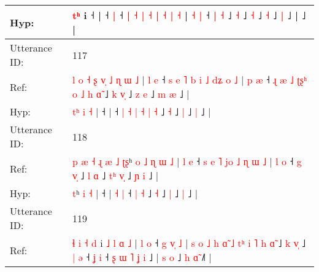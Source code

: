 \documentclass[10pt]{article}
\DeclareRobustCommand{\hl}[1]{{\textcolor{red}{#1}}}
\begin{document}
\begin{longtable}{ll}
 \\
Hyp: & \hl{}\hl{}\hl{}\hl{t}\hl{ʰ} i ˧\hl{}\hl{}\hl{}\hl{}\hl{}\hl{}\hl{}\hl{}\hl{}\hl{}\hl{}\hl{}\hl{}\hl{}\hl{}\hl{}\hl{}\hl{}\hl{} |\hl{}\hl{}\hl{}\hl{}\hl{}\hl{}\hl{}\hl{} ˧\hl{}\hl{} \hl{|} ˧\hl{}\hl{} \hl{|} \hl{˧} \hl{|} \hl{˧} \hl{|} \hl{˧} \hl{|} \hl{˧} | \hl{˧} \hl{|} ˧ \hl{|} \hl{}\hl{˧} ˩\hl{}\hl{} \hl{}\hl{˧} ˩\hl{}\hl{} \hl{}\hl{˧} ˩\hl{}\hl{} \hl{˧} ˩\hl{}\hl{} \hl{|} ˩ |\hl{}\hl{}\hl{}\hl{}\hl{}\hl{}\hl{}\hl{}\hl{}\hl{}\hl{}\hl{} ˩ |
 \\
\midrule
Utterance ID: & 117 \\
Ref: & \hl{l}\hl{ }\hl{o}\hl{ }\hl{˧}\hl{ }\hl{ʂ}\hl{ }\hl{v}\hl{̩}\hl{ }\hl{˩}\hl{ }\hl{ɳ} \hl{ɯ} \hl{˩} |\hl{ }\hl{l}\hl{ }\hl{e} ˧\hl{ }\hl{s}\hl{ }\hl{e}\hl{ }\hl{˥}\hl{ }\hl{b}\hl{ }\hl{i}\hl{ }\hl{˩}\hl{ }\hl{d}\hl{ʑ}\hl{ }\hl{o}\hl{ }\hl{˩} |\hl{ }\hl{p}\hl{ }\hl{æ} ˧\hl{ }\hl{ɻ}\hl{ }\hl{æ} \hl{˩} \hl{ʈ}\hl{ʂ}\hl{ʰ} \hl{o} \hl{˩} \hl{h} \hl{ɑ}\hl{̃} ˩\hl{ }\hl{k} \hl{v}\hl{̩} ˩\hl{ }\hl{z} \hl{e} ˩\hl{ }\hl{m} \hl{æ} ˩ |
 \\
Hyp: & \hl{}\hl{}\hl{}\hl{}\hl{}\hl{}\hl{}\hl{}\hl{}\hl{}\hl{}\hl{}\hl{t}\hl{ʰ} \hl{i} \hl{˧} |\hl{}\hl{}\hl{}\hl{} ˧\hl{}\hl{}\hl{}\hl{}\hl{}\hl{}\hl{}\hl{}\hl{}\hl{}\hl{}\hl{}\hl{}\hl{}\hl{}\hl{}\hl{}\hl{}\hl{} |\hl{}\hl{}\hl{}\hl{} ˧\hl{}\hl{}\hl{}\hl{} \hl{|} \hl{}\hl{}\hl{˧} \hl{|} \hl{˧} \hl{|} \hl{}\hl{˧} ˩\hl{}\hl{} \hl{}\hl{˧} ˩\hl{}\hl{} \hl{|} ˩\hl{}\hl{} \hl{|} ˩ |
 \\
\midrule
Utterance ID: & 118 \\
Ref: & \hl{p}\hl{ }\hl{æ}\hl{ }\hl{˧}\hl{ }\hl{ɻ}\hl{ }\hl{æ}\hl{ }\hl{˩}\hl{ }\hl{ʈ}\hl{ʂ}ʰ\hl{ }\hl{o}\hl{ }\hl{˩}\hl{ }\hl{ɳ} \hl{ɯ} \hl{˩} |\hl{ }\hl{l}\hl{ }\hl{e} ˧\hl{ }\hl{s}\hl{ }\hl{e}\hl{ }\hl{˥}\hl{ }\hl{j}\hl{o}\hl{ }\hl{˩}\hl{ }\hl{ɳ}\hl{ }\hl{ɯ}\hl{ }\hl{˩} | \hl{l} \hl{o} ˧ \hl{g} \hl{v}\hl{̩} ˩\hl{ }\hl{l} \hl{ɑ} ˩\hl{ }\hl{t}\hl{ʰ} \hl{v}\hl{̩} ˩\hl{ }\hl{ɲ} \hl{i} ˩ |
 \\
Hyp: & \hl{}\hl{}\hl{}\hl{}\hl{}\hl{}\hl{}\hl{}\hl{}\hl{}\hl{}\hl{}\hl{}\hl{t}ʰ\hl{}\hl{}\hl{}\hl{}\hl{}\hl{} \hl{i} \hl{˧} |\hl{}\hl{}\hl{}\hl{} ˧\hl{}\hl{}\hl{}\hl{}\hl{}\hl{}\hl{}\hl{}\hl{}\hl{}\hl{}\hl{}\hl{}\hl{}\hl{}\hl{}\hl{} | \hl{˧} \hl{|} ˧ \hl{|} \hl{}\hl{˧} ˩\hl{}\hl{} \hl{˧} ˩\hl{}\hl{}\hl{} \hl{}\hl{|} ˩\hl{}\hl{} \hl{|} ˩ |
 \\
\midrule
Utterance ID: & 119 \\
Ref: & \hl{ɬ}\hl{ }\hl{i}\hl{ }\hl{˧}\hl{ }\hl{d} i\hl{ }\hl{˩}\hl{ }\hl{l}\hl{ }\hl{ɑ} \hl{˩} |\hl{ }\hl{l}\hl{ }\hl{o} ˧\hl{ }\hl{g}\hl{ }\hl{v}\hl{̩}\hl{ }\hl{˩} |\hl{ }\hl{s}\hl{ }\hl{o}\hl{ }\hl{˩}\hl{ }\hl{h} \hl{ɑ}\hl{̃} \hl{˩} \hl{t}\hl{ʰ} \hl{i} \hl{˥} \hl{h} \hl{ɑ}\hl{̃} ˩\hl{ }\hl{k} \hl{v}\hl{̩} ˩\hl{ }\hl{|}\hl{ }\hl{ə} ˧\hl{ }\hl{ʝ} \hl{i} ˧\hl{ }\hl{ʂ}\hl{ }\hl{ɯ}\hl{ }\hl{˥}\hl{ }\hl{ʝ}\hl{ }\hl{i} ˩ |\hl{ }\hl{s}\hl{ }\hl{o} ˩\hl{ }\hl{h} \hl{ɑ}\hl{̃} ˩\hl{˥} |

\end{longtable}
\end{document}
